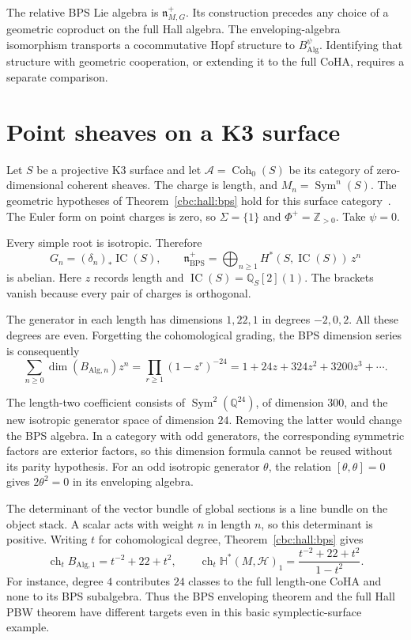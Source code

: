 The relative BPS Lie algebra is $\mathfrak n^+_{M,G}$.
Its construction precedes any choice of a geometric coproduct on the full Hall algebra.
The enveloping-algebra isomorphism transports a cocommutative Hopf structure to $B_{\mathrm{Alg}}^\psi$.
Identifying that structure with geometric cooperation, or extending it to the full CoHA, requires a separate comparison.

\section{Point sheaves on a K3 surface}
Let $S$ be a projective K3 surface and let $\mathcal A=\operatorname{Coh}_0(S)$ be its category of zero-dimensional coherent sheaves.
The charge is length, and $M_n=\operatorname{Sym}^n(S)$.
The geometric hypotheses of Theorem~\ref{cbc:hall:bps} hold for this surface category~\cite[\S4]{DHS}.
The Euler form on point charges is zero, so $\Sigma=\{1\}$ and $\Phi^+=\mathbb Z_{>0}$.
Take $\psi=0$.

Every simple root is isotropic.
Therefore
\[
 G_n=(\delta_n)_*\operatorname{IC}(S),
 \qquad
 \mathfrak n^+_{\mathrm{BPS}}
   =\bigoplus_{n\geq1}H^*(S,\operatorname{IC}(S))\,z^n
\]
is abelian.
Here $z$ records length and $\operatorname{IC}(S)=\mathbb Q_S[2](1)$.
The brackets vanish because every pair of charges is orthogonal.

The generator in each length has dimensions $1,22,1$ in degrees $-2,0,2$.
All these degrees are even.
Forgetting the cohomological grading, the BPS dimension series is consequently
\begin{equation}\label{cbc:hall:k3}
 \sum_{n\geq0}\dim(B_{\mathrm{Alg},n})z^n
   =\prod_{r\geq1}(1-z^r)^{-24}
   =1+24z+324z^2+3200z^3+\cdots.
\end{equation}

The length-two coefficient consists of $\operatorname{Sym}^2(\mathbb Q^{24})$, of dimension $300$, and the new isotropic generator space of dimension $24$.
Removing the latter would change the BPS algebra.
In a category with odd generators, the corresponding symmetric factors are exterior factors, so this dimension formula cannot be reused without its parity hypothesis.
For an odd isotropic generator $\theta$, the relation $[\theta,\theta]=0$ gives $2\theta^2=0$ in its enveloping algebra.

The determinant of the vector bundle of global sections is a line bundle on the object stack.
A scalar acts with weight $n$ in length $n$, so this determinant is positive.
Writing $t$ for cohomological degree, Theorem~\ref{cbc:hall:bps} gives
\[
 \operatorname{ch}_t B_{\mathrm{Alg},1}=t^{-2}+22+t^2,
 \qquad
 \operatorname{ch}_t\mathbb H^*(M,\mathscr H)_1
       =\frac{t^{-2}+22+t^2}{1-t^2}.
\]
For instance, degree $4$ contributes $24$ classes to the full length-one CoHA and none to its BPS subalgebra.
Thus the BPS enveloping theorem and the full Hall PBW theorem have different targets even in this basic symplectic-surface example.

